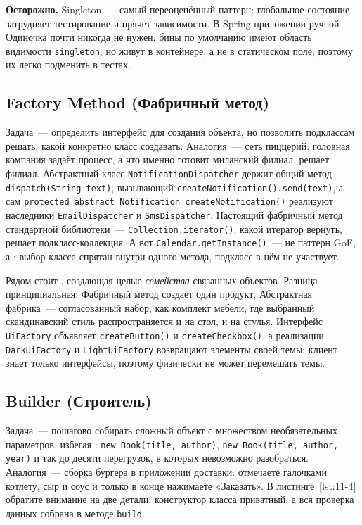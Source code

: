 \begin{oshibka}
\textbf{Осторожно.} Singleton~--- самый переоценённый паттерн: глобальное
состояние затрудняет тестирование и прячет зависимости. В Spring-приложении
ручной Одиночка почти никогда не нужен: бины по умолчанию имеют область
видимости \texttt{singleton}, но живут в контейнере, а не в статическом поле,
поэтому их легко подменить в тестах.
\end{oshibka}

\subsection{Factory Method (Фабричный метод)}

Задача~--- определить интерфейс для создания объекта, но позволить подклассам
решать, какой конкретно класс создавать. Аналогия~--- сеть пиццерий: головная
компания задаёт процесс, а что именно готовит миланский филиал, решает филиал.
Абстрактный класс \texttt{NotificationDispatcher} держит общий метод
\texttt{dispatch(String text)}, вызывающий
\texttt{createNotification().send(text)}, а сам
\texttt{protected abstract Notification createNotification()} реализуют
наследники \texttt{EmailDispatcher} и \texttt{SmsDispatcher}. Настоящий
фабричный метод стандартной библиотеки~--- \texttt{Collection.iterator()}: какой
итератор вернуть, решает подкласс-коллекция. А вот
\texttt{Calendar.getInstance()}~--- не паттерн GoF, а : выбор класса спрятан внутри одного метода, подкласс в нём не
участвует.

Рядом стоит , создающая целые \emph{семейства}
связанных объектов. Разница принципиальная: Фабричный метод создаёт один
продукт, Абстрактная фабрика~--- согласованный набор, как комплект мебели, где
выбранный скандинавский стиль распространяется и на стол, и на стулья. Интерфейс
\texttt{UiFactory} объявляет \texttt{createButton()} и \texttt{createCheckbox()},
а реализации \texttt{DarkUiFactory} и \texttt{LightUiFactory} возвращают
элементы своей темы; клиент знает только интерфейсы, поэтому физически не может
перемешать темы.

\subsection{Builder (Строитель)}

Задача~--- пошагово собирать сложный объект с множеством необязательных
параметров, избегая :
\texttt{new Book(title, author)}, \texttt{new Book(title, author, year)} и так
до десяти перегрузок, в которых невозможно разобраться. Аналогия~--- сборка
бургера в приложении доставки: отмечаете галочками котлету, сыр и соус и только
в конце нажимаете «Заказать». В листинге~\ref{lst:11-4} обратите внимание на две
детали: конструктор класса приватный, а вся проверка данных собрана в методе
\texttt{build}.


